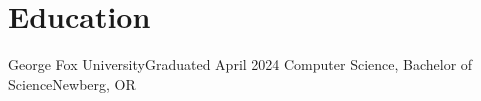 \section{Education}
  \resumeSubHeadingListStart
    \resumeSubheading
        {George Fox University}{Graduated April 2024}
        {Computer Science, Bachelor of Science}{Newberg, OR}
  \resumeSubHeadingListEnd
